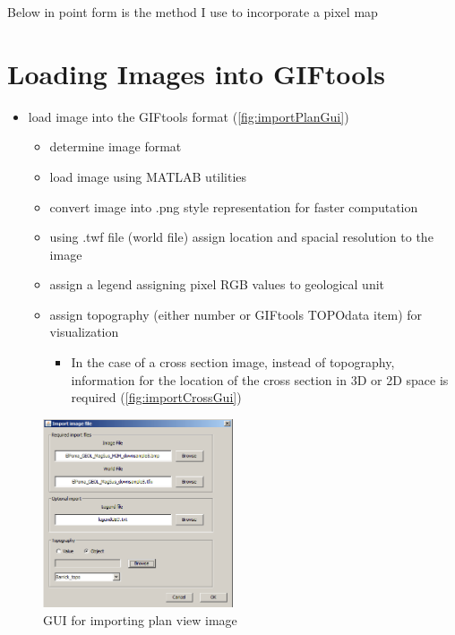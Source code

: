 Below in point form is the method I use to incorporate a pixel map

\section{Loading Images into GIFtools}
\label{sec:Load Images into GIFtools}

\begin{itemize}
\item load image into the GIFtools format (\autoref{fig:importPlanGui})
\begin{itemize}
	\item determine image format
	\item load image using MATLAB utilities
	\item convert image into .png style representation for faster computation
	\item using .twf file (world file) assign location and spacial resolution to the image
	\item assign a legend assigning pixel RGB values to geological unit
	\item assign topography (either number or GIFtools TOPOdata item) for visualization
	\begin{itemize}
		\item In the case of a cross section image, instead of topography, information for the location of the cross section in 3D or 2D space is required (\autoref{fig:importCrossGui})
	\end{itemize}
\end{itemize}
\end{itemize}
\begin{figure} [h]
    \centering
    \includegraphics[width=0.5\textwidth]{images/MaptoModel/importPlan.PNG}
    \caption{GUI for importing plan view image }
    \label{fig:importPlanGui}
\end{figure}
